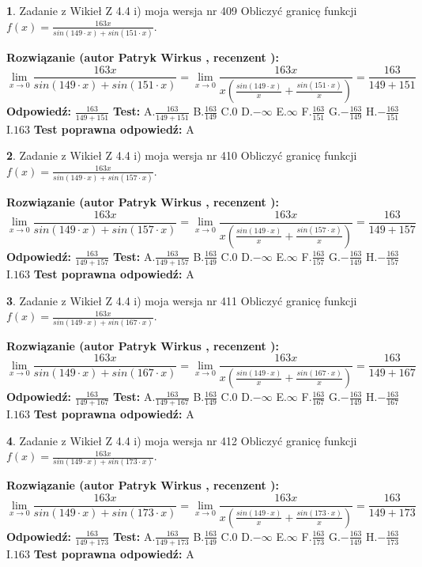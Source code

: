 \documentclass[12pt, a4paper]{article}
\theoremstyle{definition} %
\newtheorem{zad}{}
\newcommand{\zadStart}[1]{\begin{zad}#1\newline}
\newcommand{\zadStop}{\end{zad}}
\newcommand{\rozwStart}[2]{\noindent \textbf{Rozwiązanie (autor #1 , recenzent #2): }\newline}
\newcommand{\rozwStop}{\newline}
\newcommand{\odpStart}{\noindent \textbf{Odpowiedź:}\newline}
\newcommand{\odpStop}{\newline}
\newcommand{\testStart}{\noindent \textbf{Test:}\newline}
\newcommand{\testStop}{\newline}
\newcommand{\kluczStart}{\noindent \textbf{Test poprawna odpowiedź:}\newline}
\newcommand{\kluczStop}{\newline}
\begin{document}
\zadStart{Zadanie z Wikieł Z 4.4 i) moja wersja nr 409}
Obliczyć granicę funkcji $f(x)=\frac{163x}{sin(149\cdot x) +sin(151\cdot x)}$.
\zadStop
\rozwStart{Patryk Wirkus}{}
$$\lim\limits_{x\to 0}\frac{163x}{sin(149\cdot x) +sin(151\cdot x)}=\lim\limits_{x\to 0}\frac{163x}{x(\frac{sin(149\cdot x)}{x}+\frac{sin(151\cdot x)}{x})}=\frac{163}{149+151}$$
\rozwStop
\odpStart
$\frac{163}{149+151}$
\odpStop
\testStart
A.$\frac{163}{149+151}$
B.$\frac{163}{149}$
C.$0$
D.$-\infty$
E.$\infty$
F.$\frac{163}{151}$
G.$-\frac{163}{149}$
H.$-\frac{163}{151}$
I.$163$
\testStop
\kluczStart
A
\kluczStop



\zadStart{Zadanie z Wikieł Z 4.4 i) moja wersja nr 410}
Obliczyć granicę funkcji $f(x)=\frac{163x}{sin(149\cdot x) +sin(157\cdot x)}$.
\zadStop
\rozwStart{Patryk Wirkus}{}
$$\lim\limits_{x\to 0}\frac{163x}{sin(149\cdot x) +sin(157\cdot x)}=\lim\limits_{x\to 0}\frac{163x}{x(\frac{sin(149\cdot x)}{x}+\frac{sin(157\cdot x)}{x})}=\frac{163}{149+157}$$
\rozwStop
\odpStart
$\frac{163}{149+157}$
\odpStop
\testStart
A.$\frac{163}{149+157}$
B.$\frac{163}{149}$
C.$0$
D.$-\infty$
E.$\infty$
F.$\frac{163}{157}$
G.$-\frac{163}{149}$
H.$-\frac{163}{157}$
I.$163$
\testStop
\kluczStart
A
\kluczStop



\zadStart{Zadanie z Wikieł Z 4.4 i) moja wersja nr 411}
Obliczyć granicę funkcji $f(x)=\frac{163x}{sin(149\cdot x) +sin(167\cdot x)}$.
\zadStop
\rozwStart{Patryk Wirkus}{}
$$\lim\limits_{x\to 0}\frac{163x}{sin(149\cdot x) +sin(167\cdot x)}=\lim\limits_{x\to 0}\frac{163x}{x(\frac{sin(149\cdot x)}{x}+\frac{sin(167\cdot x)}{x})}=\frac{163}{149+167}$$
\rozwStop
\odpStart
$\frac{163}{149+167}$
\odpStop
\testStart
A.$\frac{163}{149+167}$
B.$\frac{163}{149}$
C.$0$
D.$-\infty$
E.$\infty$
F.$\frac{163}{167}$
G.$-\frac{163}{149}$
H.$-\frac{163}{167}$
I.$163$
\testStop
\kluczStart
A
\kluczStop



\zadStart{Zadanie z Wikieł Z 4.4 i) moja wersja nr 412}
Obliczyć granicę funkcji $f(x)=\frac{163x}{sin(149\cdot x) +sin(173\cdot x)}$.
\zadStop
\rozwStart{Patryk Wirkus}{}
$$\lim\limits_{x\to 0}\frac{163x}{sin(149\cdot x) +sin(173\cdot x)}=\lim\limits_{x\to 0}\frac{163x}{x(\frac{sin(149\cdot x)}{x}+\frac{sin(173\cdot x)}{x})}=\frac{163}{149+173}$$
\rozwStop
\odpStart
$\frac{163}{149+173}$
\odpStop
\testStart
A.$\frac{163}{149+173}$
B.$\frac{163}{149}$
C.$0$
D.$-\infty$
E.$\infty$
F.$\frac{163}{173}$
G.$-\frac{163}{149}$
H.$-\frac{163}{173}$
I.$163$
\testStop
\kluczStart
A
\kluczStop
\end{document}
